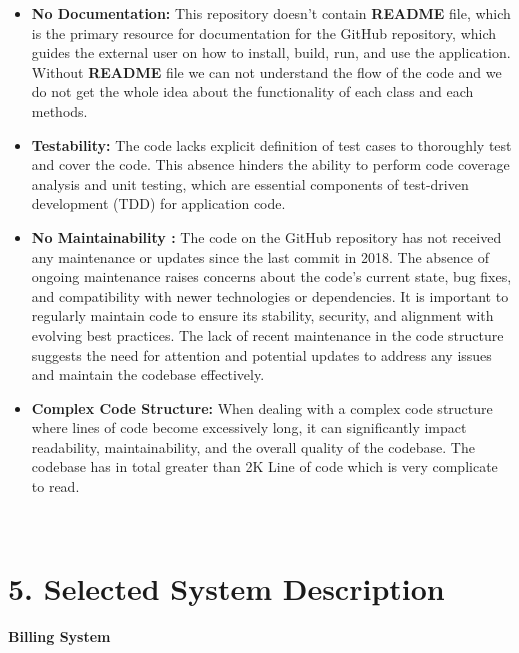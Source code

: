 \documentclass[12pt,letterpaper]{report}
\begin{document}
\begin{itemize}
    \item \textbf{No Documentation:} This repository doesn't contain \textbf{README} file, which is the primary resource for documentation for the GitHub repository, which guides the external user on how to install, build, run, and use the application. Without \textbf{README} file we can not understand the flow of the code and we do not get the whole idea about the functionality of each class and each methods. 
    \item \textbf{Testability:} The code lacks explicit definition of test cases to thoroughly test and cover the code. This absence hinders the ability to perform code coverage analysis and unit testing, which are essential components of test-driven development (TDD) for application code.
    \item \textbf{No Maintainability :} The code on the GitHub repository has not received any maintenance or updates since the last commit in 2018. The absence of ongoing maintenance raises concerns about the code's current state, bug fixes, and compatibility with newer technologies or dependencies. It is important to regularly maintain code to ensure its stability, security, and alignment with evolving best practices. The lack of recent maintenance in the code structure suggests the need for attention and potential updates to address any issues and maintain the codebase effectively.
    \item \textbf{Complex Code Structure:} When dealing with a complex code structure where lines of code become excessively long, it can significantly impact readability, maintainability, and the overall quality of the codebase. The codebase has in total greater than 2K Line of code which is very complicate to read.
    
\end{itemize}
\\
\pagebreak


\newpage
{}
\section*{5. Selected System Description}
\normalsize \textbf{Billing System}

\end{document}
